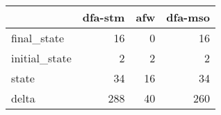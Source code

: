 \begin{tabular}{lrrr}
\toprule
{} &  dfa-stm &  afw &  dfa-mso \\
\midrule
final\_state   &       16 &    0 &       16 \\
initial\_state &        2 &    2 &        2 \\
state         &       34 &   16 &       34 \\
delta         &      288 &   40 &      260 \\
\bottomrule
\end{tabular}

